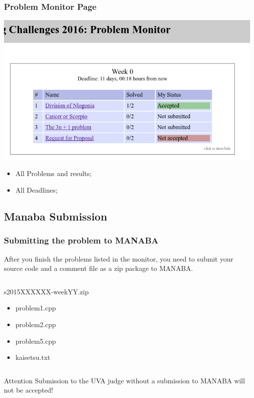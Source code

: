 \documentclass{beamer}
\begin{document}
\begin{frame}
  \frametitle{Problem Monitor Page}


  \begin{center}
    \includegraphics[width=1\textwidth]{../img/monitorpage2}
  \end{center}

  \begin{itemize}
    \item All Problems and results;
    \item All Deadlines;
  \end{itemize}

\end{frame}

\subsection{Manaba Submission}
\begin{frame}
  \frametitle{Submitting the problem to MANABA}

  {\small
  After you finish the problems listed in the monitor, you need to
  submit your source code and a comment file as a zip package to MANABA.}

  \medskip

  {\small
  \begin{columns}
    \begin{block}{s2015XXXXXX-weekYY.zip}
      \begin{itemize}
      \item problem1.cpp
      \item problem2.cpp
      \item problem5.cpp
      \item kaisetsu.txt
      \end{itemize}
    \end{block}
  \end{columns}
  }

  \medskip

  \begin{alertblock}{Attention}
  Submission to the UVA judge without a submission to MANABA will not
  be accepted!
  \end{alertblock}
\end{frame}
\end{document}
